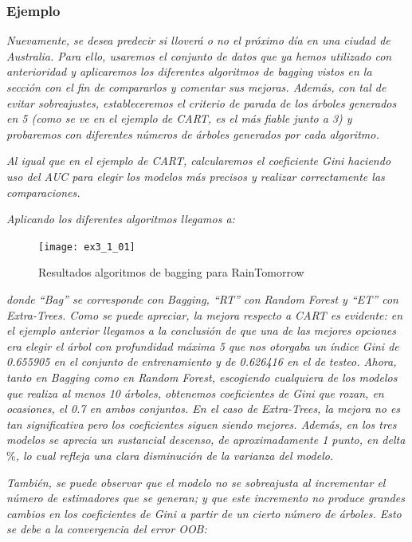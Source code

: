 \documentclass[12pt,twoside]{article}
\begin{document}


\subsubsection{Ejemplo} \label{ex:Bag}
\emph{Nuevamente, se desea predecir si lloverá o no el próximo día en una ciudad de Australia. Para ello, usaremos el conjunto de datos que ya hemos utilizado con anterioridad y aplicaremos los diferentes algoritmos de bagging vistos en la sección con el fin de compararlos y comentar sus mejoras. Además, con tal de evitar sobreajustes, estableceremos el criterio de parada de los árboles generados en 5 (como se ve en el ejemplo de CART, es el más fiable junto a 3) y probaremos con diferentes números de árboles generados por cada algoritmo.}

\emph{Al igual que en el ejemplo de CART, calcularemos el coeficiente Gini haciendo uso del AUC para elegir los modelos más precisos y realizar correctamente las comparaciones.}

\emph{Aplicando los diferentes algoritmos llegamos a: }

\begin{figure}[h]
\centering
\texttt{[image: ex3\_1\_01]}
\caption{Resultados algoritmos de bagging para RainTomorrow}
\end{figure}

\newpage
\noindent
\emph{donde ``Bag'' se corresponde con Bagging, ``RT'' con Random Forest y ``ET'' con Extra-Trees. Como se puede apreciar, la mejora respecto a CART es evidente: en el ejemplo anterior llegamos a la conclusión de que una de las mejores opciones era elegir el árbol con profundidad máxima 5 que nos otorgaba un índice Gini de 0.655905 en el conjunto de entrenamiento y de 0.626416 en el de testeo. Ahora, tanto en Bagging como en Random Forest, escogiendo cualquiera de los modelos que realiza al menos 10 árboles, obtenemos coeficientes de Gini que rozan, en ocasiones, el 0.7 en ambos conjuntos. En el caso de Extra-Trees, la mejora no es tan significativa pero los coeficientes siguen siendo mejores. Además, en los tres modelos se aprecia un sustancial descenso, de aproximadamente 1 punto, en delta$\%$, lo cual refleja una clara disminución de la varianza del modelo.}

\emph{También, se puede observar que el modelo no se sobreajusta al incrementar el número de estimadores que se generan; y que este incremento no produce grandes cambios en los coeficientes de Gini a partir de un cierto número de árboles. Esto se debe a la convergencia del error OOB:}
\end{document}
